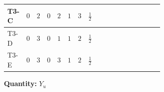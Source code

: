\documentclass[8pt]{article}
\begin{document}
\begin{landscape}
\begin{longtable}{@{}llcccccc >{\raggedright\arraybackslash}p{0.21\linewidth} >{\raggedright\arraybackslash}p{0.21\linewidth} >{\raggedright\arraybackslash}p{0.21\linewidth}@{}}
\midrule
T3-C & $0$ & $2$ & $0$ & $2$ & $1$ & $3$ & $\frac{1}{2}$ & \scriptsize\adjustbox{max width=\linewidth}{$\begin{gathered} -\frac{3}{2} (\left({Y_d}\,\left({Y_d}\right)^{\dagger}\,{Y_u}\right)_{ij}-\left({Y_u}\,\left({Y_u}\right)^{\dagger}\,{Y_u}\right)_{ij})\end{gathered}$} & \scriptsize\adjustbox{max width=\linewidth}{$\begin{gathered} -\frac{9}{4} {g_2}^2 \left({Y_u}\right)_{ij}\end{gathered}$} & \scriptsize\adjustbox{max width=\linewidth}{$\begin{gathered} -8 {g_3}^2 \left({Y_u}\right)_{ij}\end{gathered}$} \\
\midrule
T3-D & $0$ & $3$ & $0$ & $1$ & $1$ & $2$ & $\frac{1}{2}$ & \scriptsize\adjustbox{max width=\linewidth}{$\begin{gathered} -\frac{3}{2} (\left({Y_d}\,\left({Y_d}\right)^{\dagger}\,{Y_u}\right)_{ij}-\left({Y_u}\,\left({Y_u}\right)^{\dagger}\,{Y_u}\right)_{ij})\end{gathered}$} & \scriptsize\adjustbox{max width=\linewidth}{$\begin{gathered} -\frac{9}{4} {g_2}^2 \left({Y_u}\right)_{ij}\end{gathered}$} & \scriptsize\adjustbox{max width=\linewidth}{$\begin{gathered} -8 {g_3}^2 \left({Y_u}\right)_{ij}\end{gathered}$} \\
\midrule
T3-E & $0$ & $3$ & $0$ & $3$ & $1$ & $2$ & $\frac{1}{2}$ & \scriptsize\adjustbox{max width=\linewidth}{$\begin{gathered} -\frac{3}{2} (\left({Y_d}\,\left({Y_d}\right)^{\dagger}\,{Y_u}\right)_{ij}-\left({Y_u}\,\left({Y_u}\right)^{\dagger}\,{Y_u}\right)_{ij})\end{gathered}$} & \scriptsize\adjustbox{max width=\linewidth}{$\begin{gathered} -\frac{9}{4} {g_2}^2 \left({Y_u}\right)_{ij}\end{gathered}$} & \scriptsize\adjustbox{max width=\linewidth}{$\begin{gathered} -8 {g_3}^2 \left({Y_u}\right)_{ij}\end{gathered}$} \\
\midrule
\bottomrule
\end{longtable}
\clearpage
\noindent\textbf{Quantity: }$Y_u$\par\smallskip

\end{landscape}
\end{document}
